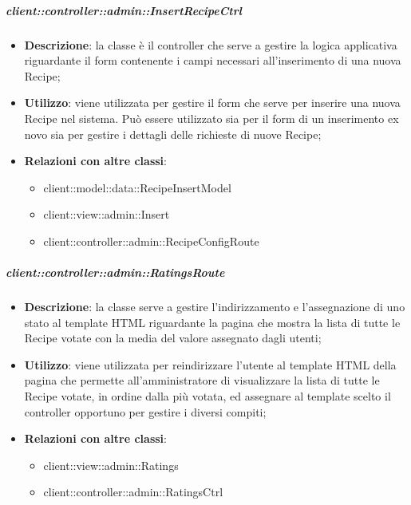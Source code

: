 		\subparagraph{client::controller::admin::InsertRecipeCtrl} %
		\label{subp:bdsm_app_client_controller_admin_insertctrl}
			\begin{itemize}
				\item \textbf{Descrizione}: la classe è il controller che serve a gestire la logica applicativa riguardante il form contenente i campi necessari all'inserimento di una nuova Recipe;
				\item \textbf{Utilizzo}: viene utilizzata per gestire il form che serve per inserire una nuova Recipe nel sistema. Può essere utilizzato sia per il form di un inserimento ex novo sia per gestire i dettagli delle richieste di nuove Recipe;
				\item \textbf{Relazioni con altre classi}:
					\begin{itemize}
						\item client::model::data::RecipeInsertModel
						\item client::view::admin::Insert
						\item client::controller::admin::RecipeConfigRoute
					\end{itemize}
			\end{itemize}

		\subparagraph{client::controller::admin::RatingsRoute} %
		\label{subp:bdsm_app_client_controller_admin_ratingsroute}
			\begin{itemize}
				\item \textbf{Descrizione}: la classe serve a gestire l'indirizzamento e l'assegnazione di uno stato al template HTML riguardante la pagina che mostra la lista di tutte le Recipe votate con la media del valore assegnato dagli utenti;
				\item \textbf{Utilizzo}: viene utilizzata per reindirizzare l'utente al template HTML della pagina che permette all'amministratore di visualizzare la lista di tutte le Recipe votate, in ordine dalla più votata, ed assegnare al template scelto il controller opportuno per gestire i diversi compiti;
				\item \textbf{Relazioni con altre classi}:
					\begin{itemize}
						\item client::view::admin::Ratings
						\item client::controller::admin::RatingsCtrl
					\end{itemize}
			\end{itemize}

